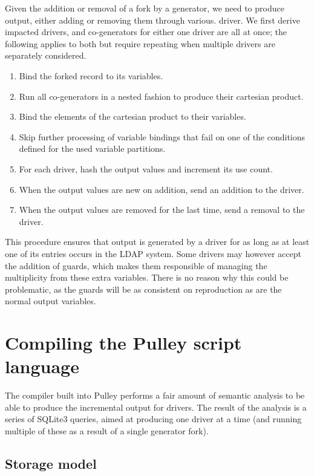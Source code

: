 \documentclass[a4paper]{article}
\begin{document}
Given the addition or removal of a fork by a generator, we need to produce output, either adding or removing them through various. driver.  We first derive impacted drivers, and co-generators for either one driver are all at once; the following applies to both but require repeating when multiple drivers are separately considered.

\begin{enumerate}
\item Bind the forked record to its variables.
\item Run all co-generators in a nested fashion to produce their cartesian product.
\item Bind the elements of the cartesian product to their variables.
\item Skip further processing of variable bindings that fail on one of the conditions defined for the used variable partitions.
\item For each driver, hash the output values and increment its use count.
\item When the output values are new on addition, send an addition to the driver.
\item When the output values are removed for the last time, send a removal to the driver.
\end{enumerate}

This procedure ensures that output is generated by a driver for as long as at least one of its entries occurs in the LDAP system.  Some drivers may however accept the addition of guards, which makes them responsible of managing the multiplicity from these extra variables.  There is no reason why this could be problematic, as the guards will be as consistent on reproduction as are the normal output variables.

\section{Compiling the Pulley script language}

The compiler built into Pulley performs a fair amount of semantic analysis to be able to produce the incremental output for drivers.  The result of the analysis is a series of SQLite3 queries, aimed at producing one driver at a time (and running multiple of these as a result of a single generator fork).

\subsection{Storage model}
 
\end{document}
